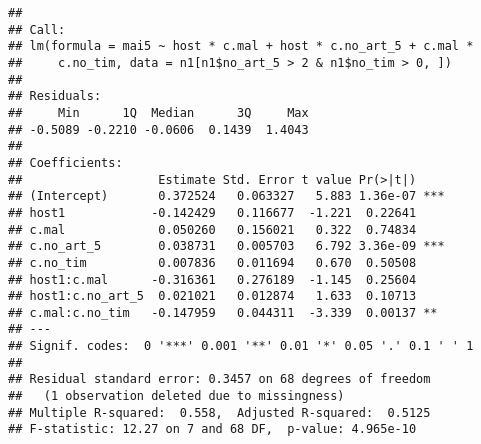 \documentclass[]{article}
\newenvironment{Shaded}{\begin{snugshade}}{\end{snugshade}}
\newcommand{\KeywordTok}[1]{\textcolor[rgb]{0.13,0.29,0.53}{\textbf{#1}}}
\newcommand{\DataTypeTok}[1]{\textcolor[rgb]{0.13,0.29,0.53}{#1}}
\newcommand{\DecValTok}[1]{\textcolor[rgb]{0.00,0.00,0.81}{#1}}
\newcommand{\StringTok}[1]{\textcolor[rgb]{0.31,0.60,0.02}{#1}}
\newcommand{\OperatorTok}[1]{\textcolor[rgb]{0.81,0.36,0.00}{\textbf{#1}}}
\newcommand{\NormalTok}[1]{#1}
\begin{document}
\begin{verbatim}
## 
## Call:
## lm(formula = mai5 ~ host * c.mal + host * c.no_art_5 + c.mal * 
##     c.no_tim, data = n1[n1$no_art_5 > 2 & n1$no_tim > 0, ])
## 
## Residuals:
##     Min      1Q  Median      3Q     Max 
## -0.5089 -0.2210 -0.0606  0.1439  1.4043 
## 
## Coefficients:
##                   Estimate Std. Error t value Pr(>|t|)    
## (Intercept)       0.372524   0.063327   5.883 1.36e-07 ***
## host1            -0.142429   0.116677  -1.221  0.22641    
## c.mal             0.050260   0.156021   0.322  0.74834    
## c.no_art_5        0.038731   0.005703   6.792 3.36e-09 ***
## c.no_tim          0.007836   0.011694   0.670  0.50508    
## host1:c.mal      -0.316361   0.276189  -1.145  0.25604    
## host1:c.no_art_5  0.021021   0.012874   1.633  0.10713    
## c.mal:c.no_tim   -0.147959   0.044311  -3.339  0.00137 ** 
## ---
## Signif. codes:  0 '***' 0.001 '**' 0.01 '*' 0.05 '.' 0.1 ' ' 1
## 
## Residual standard error: 0.3457 on 68 degrees of freedom
##   (1 observation deleted due to missingness)
## Multiple R-squared:  0.558,  Adjusted R-squared:  0.5125 
## F-statistic: 12.27 on 7 and 68 DF,  p-value: 4.965e-10
\end{verbatim}

\begin{Shaded}
\end{Shaded}
\end{document}
